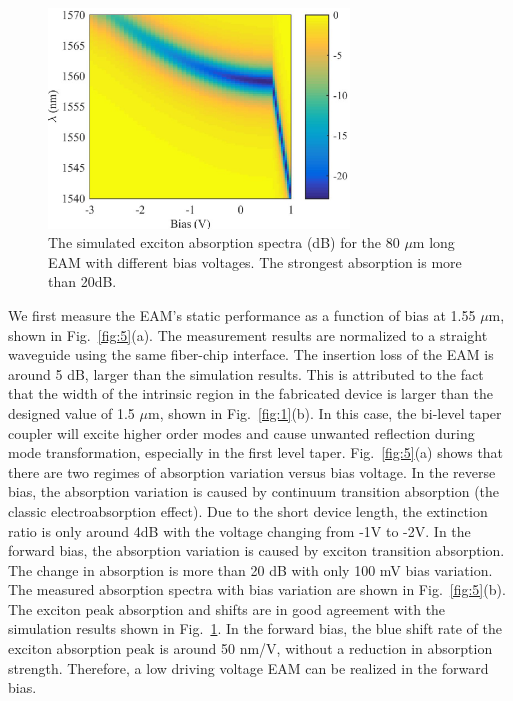 \documentclass[aip,apl,reprint,a4paper]{revtex4-1}
\begin{document}
\begin{figure}
	\includegraphics[width=8cm]{figure/fig4.eps}%
	\caption{\label{fig:4} The simulated exciton absorption spectra (dB) for the 80 $\mu$m long EAM with different bias voltages. The strongest absorption is more than 20dB.}
\end{figure}


We first measure the EAM’s static performance as a function of bias at 1.55 $\mu$m, shown in Fig.~\ref{fig:5}(a). The measurement results are normalized to a straight waveguide using the same fiber-chip interface. The insertion loss of the EAM is around 5 dB, larger than the simulation results. This is attributed to the fact that the width of the intrinsic region in the fabricated device is larger than the designed value of 1.5 $\mu$m, shown in Fig.~\ref{fig:1}(b). In this case, the bi-level taper coupler will excite higher order modes and cause unwanted reflection during mode transformation, especially in the first level taper.\cite{huang2015ultracompact} Fig.~\ref{fig:5}(a) shows that there are two regimes of absorption variation versus bias voltage. In the reverse bias, the absorption variation is caused by continuum transition absorption (the classic electroabsorption effect). Due to the short device length, the extinction ratio is only around 4dB with the voltage changing from -1V to -2V. In the forward bias, the absorption variation is caused by exciton transition absorption. The change in absorption is more than 20 dB with only 100 mV bias variation. The measured absorption spectra with bias variation are shown in Fig.~\ref{fig:5}(b). The exciton peak absorption and shifts are in good agreement with the simulation results shown in Fig.~\ref{fig:4}. In the forward bias, the blue shift rate of the exciton absorption peak is around 50 nm/V, without a reduction in absorption strength. Therefore, a low driving voltage EAM can be realized in the forward bias.
\end{document}

